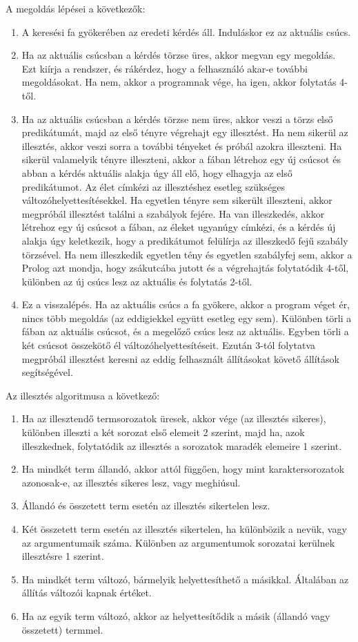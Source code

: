 A megoldás lépései a következők: 
\begin{enumerate}
	\item A keresési fa gyökerében az eredeti kérdés áll. Induláskor ez az aktuális csúcs. 
	\item Ha az aktuális csúcsban a kérdés törzse üres, akkor megvan egy megoldás. Ezt kiírja a rendszer, és rákérdez, hogy a felhasználó akar-e további megoldásokat. Ha nem, akkor a programnak vége, ha igen, akkor folytatás 4-től. 
	\item Ha az aktuális csúcsban a kérdés törzse nem üres, akkor veszi a törzs első predikátumát, majd az első tényre végrehajt egy illesztést. Ha nem sikerül az illesztés, akkor veszi sorra a további tényeket és próbál azokra illeszteni. Ha sikerül valamelyik tényre illeszteni, akkor a fában létrehoz egy új csúcsot és abban a kérdés aktuális alakja úgy áll elő, hogy elhagyja az első predikátumot. Az élet címkézi az illesztéshez esetleg szükséges változóhelyettesítésekkel. Ha egyetlen tényre sem sikerült illeszteni, akkor megpróbál illesztést találni a szabályok fejére. Ha van illeszkedés, akkor létrehoz egy új csúcsot a fában, az éleket ugyanúgy címkézi, és a kérdés új alakja úgy keletkezik, hogy a predikátumot felülírja az illeszkedő fejű szabály törzsével. Ha nem illeszkedik egyetlen tény és egyetlen szabályfej sem, akkor a Prolog azt mondja, hogy zsákutcába jutott és a végrehajtás folytatódik 4-től, különben az új csúcs lesz az aktuális és folytatás 2-től. 
	\item Ez a visszalépés. Ha az aktuális csúcs a fa gyökere, akkor a program véget ér, nincs több megoldás (az eddigiekkel együtt esetleg egy sem). Különben törli a fában az aktuális csúcsot, és a megelőző csúcs lesz az aktuális. Egyben törli a két csúcsot összekötő él változóhelyettesítéseit. Ezután 3-tól folytatva megpróbál illesztést keresni az eddig felhasznált állításokat követő állítások segítségével. 
\end{enumerate}

Az illesztés algoritmusa a következő: 
\begin{enumerate}
	\item Ha az illesztendő termsorozatok üresek, akkor vége (az illesztés sikeres), különben illeszti a két sorozat első elemeit 2 szerint, majd ha, azok illeszkednek, folytatódik az illesztés a sorozatok maradék elemeire 1 szerint. 
	\item Ha mindkét term állandó, akkor attól függően, hogy mint karaktersorozatok azonosak-e, az illesztés sikeres lesz, vagy meghiúsul. 
	\item Állandó és összetett term esetén az illesztés sikertelen lesz. 
	\item Két összetett term esetén az illesztés sikertelen, ha különbözik a nevük, vagy az argumentumaik száma. Különben az argumentumok sorozatai kerülnek illesztésre 1 szerint. 
	\item Ha mindkét term változó, bármelyik helyettesíthető a másikkal. Általában az állítás változói kapnak értéket. 
	\item Ha az egyik term változó, akkor az helyettesítődik a másik (állandó vagy összetett) termmel. 
\end{enumerate}

